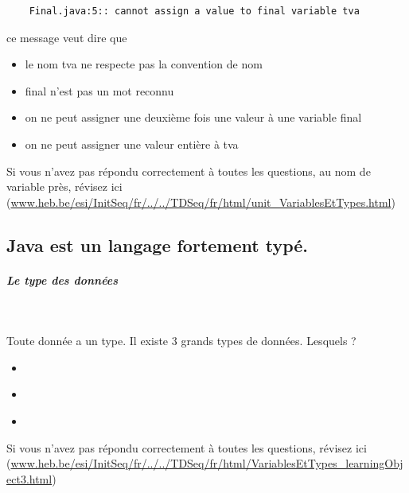 \documentclass[11pt,a4paper]{article}
\begin{document}
            \par
        \begin{verbatim}
	Final.java:5:: cannot assign a value to final variable tva\end{verbatim}ce message veut dire que
            \begin{itemize} 
        
            \item[ \ding{"6D} ] le nom tva ne respecte pas la convention de nom
        
            \item[ \ding{"6D} ] final n'est pas un mot reconnu
        
            \item[ \ding{"6D} ] on ne peut assigner une deuxi\`eme fois une valeur \`a une variable final
        
            \item[ \ding{"6D} ] on ne peut assigner une valeur enti\`ere \`a tva 
        
            \end{itemize} 
        Si vous n'avez pas r\'epondu correctement \`a toutes les questions, au nom de variable pr\`es,
				r\'evisez ici (\url{www.heb.be/esi/InitSeq/fr/../../TDSeq/fr/html/unit\_VariablesEtTypes.html})
            \par
        \subsection{Java est un langage fortement typ\'e.}
			
		\subparagraph{Le type des donn\'ees} 
		
                \textcolor{white}{.} \par
             
								Toute donn\'ee a un type. Il existe 3 grands types de donn\'ees. Lesquels ?
							
					\begin{itemize}
				
			\item  \textcolor{gray}{\underline{\hspace*{16em}}} 
			\item  \textcolor{gray}{\underline{\hspace*{16em}}} 
			\item  \textcolor{gray}{\underline{\hspace*{20em}}} 
					\end{itemize}
				Si vous n'avez pas r\'epondu correctement \`a toutes les questions, 
				    r\'evisez ici (\url{www.heb.be/esi/InitSeq/fr/../../TDSeq/fr/html/VariablesEtTypes\_learningObject3.html})
            \par
        
\end{document}

